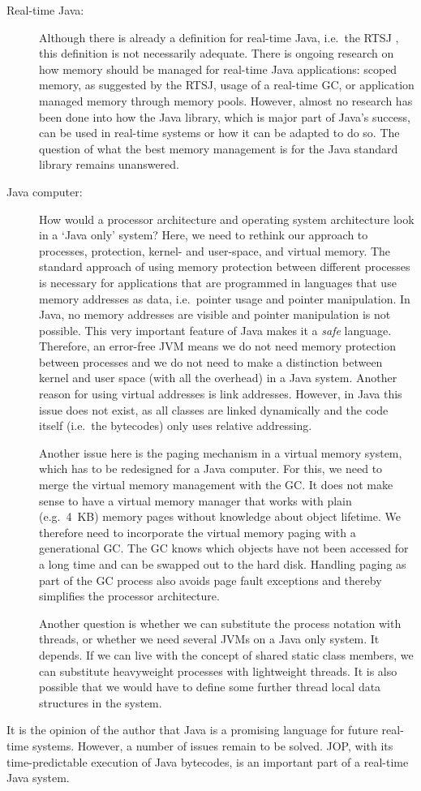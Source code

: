 \begin{description}
    \item[Real-time Java:] Although there is already a definition
        for real-time Java, i.e.\ the RTSJ \cite{rtsj}, this
        definition is not necessarily adequate. There is ongoing
        research on how memory should be managed for real-time
        Java applications: scoped memory, as suggested by the
        RTSJ, usage of a real-time GC, or application managed
        memory through memory pools. However, almost no research
        has been done into how the Java library, which is major
        part of Java's success, can be used in real-time systems
        or how it can be adapted to do so. The question of what
        the best memory management is for the Java standard
        library remains unanswered.

    \item[Java computer:] How would a processor architecture and
        operating system architecture look in a `Java only'
        system? Here, we need to rethink our approach to
        processes, protection, kernel- and user-space, and
        virtual memory. The standard approach of using memory
        protection between different processes is necessary for
        applications that are programmed in languages that use
        memory addresses as data, i.e.\ pointer usage and pointer
        manipulation. In Java, no memory addresses are visible
        and pointer manipulation is not possible. This very
        important feature of Java makes it a \emph{safe}
        language. Therefore, an error-free JVM means we do not
        need memory protection between processes and we do not
        need to make a distinction between kernel and user space
        (with all the overhead) in a Java system. Another reason
        for using virtual addresses is link addresses. However,
        in Java this issue does not exist, as all classes are
        linked dynamically and the code itself (i.e.\ the
        bytecodes) only uses relative addressing.

Another issue here is the paging mechanism in a virtual memory
system, which has to be redesigned for a Java computer. For this,
we need to merge the virtual memory management with the GC. It
does not make sense to have a virtual memory manager that works
with plain (e.g.\ 4~KB) memory pages without knowledge about
object lifetime. We therefore need to incorporate the virtual
memory paging with a generational GC. The GC knows which objects
have not been accessed for a long time and can be swapped out to
the hard disk. Handling paging as part of the GC process also
avoids page fault exceptions and thereby simplifies the processor
architecture.

Another question is whether we can substitute the process
notation with threads, or whether we need several JVMs on a Java
only system. It depends. If we can live with the concept of
shared static class members, we can substitute heavyweight
processes with lightweight threads. It is also possible that we
would have to define some further thread local data structures in
the system.

\end{description}
%
It is the opinion of the author that Java is a promising language for
future real-time systems. However, a number of issues remain to be
solved. JOP, with its time-predictable execution of Java bytecodes,
is an important part of a real-time Java system.
